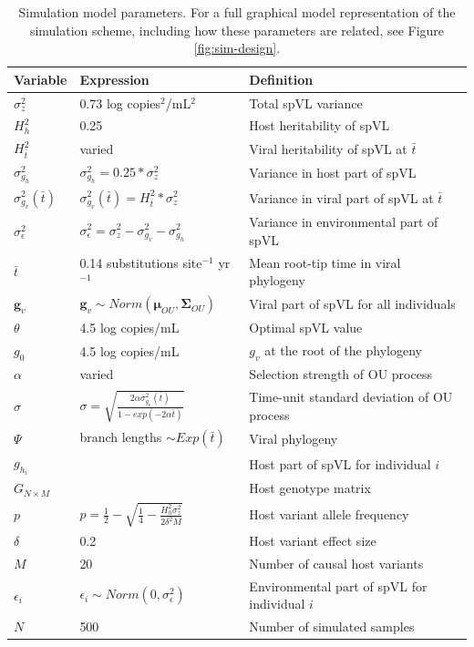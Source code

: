 \documentclass[11pt]{article}
\begin{document}
\begin{linenumbers}
\begin{table}[H]
	\caption{Simulation model parameters. For a full graphical model representation of the simulation scheme, including how these parameters are related, see Figure \ref{fig:sim-design}.}
	\begin{tabularx}{\linewidth}{p{1.5cm}ll} \toprule 
		Variable & Expression & Definition \\ \midrule 
		$\sigma^2_z$ &  0.73 log copies$^{2}$/mL$^{2}$ & Total spVL variance \\ 
		$H^2_h$ & 0.25 & Host heritability of spVL \\
		$H^2_{\bar{t}}$ & varied & Viral heritability of spVL at $\bar{t}$ \\
		$\sigma^2_{g_h}$ & $\sigma_{g_h}^2 = 0.25*\sigma_z^2$ & Variance in host part of spVL \\
		$\sigma^2_{g_v}(\bar{t})$ & $\sigma^2_{g_{v}}(\bar{t}) = H^2_{\bar{t}}*\sigma_z^2$ & Variance in viral part of spVL at $\bar{t}$ \\ 
		$\sigma^2_{\epsilon}$ & $\sigma_{\epsilon}^2 = \sigma_z^2 - \sigma^2_{g_v} - \sigma^2_{g_h}$ & Variance in environmental part of spVL \\ 
		$\bar{t}$ & 0.14 substitutions site$^{-1}$ yr$^{-1}$ & Mean root-tip time in viral phylogeny \\ 
		$\bm{g}_v$ & $\bm{g}_v \sim Norm(\bm{\mu}_{OU}, \boldsymbol{\Sigma}_{OU})$ & Viral part of spVL for all individuals \\ 
		$\theta$ & 4.5 log copies/mL & Optimal spVL value \\
		$g_{0}$ & 4.5 log copies/mL & $g_v$ at the root of the phylogeny  \\ 
		$\alpha$ & varied & Selection strength of OU process \\ 
		$\sigma$ & $\sigma = \sqrt{\frac{2\alpha\sigma^2_{g_{v}}(\bar{t})}{1 - exp(-2\alpha\bar{t})}}$ & Time-unit standard deviation of OU process \\ 
		$\Psi$ & branch lengths $\sim Exp(\bar{t})$ & Viral phylogeny \\ 
		$g_{h_i}$ & \makecell{$g_{h_i} = \delta \sum_{j = 1}^{j = M/2}{G_{ij}} - \\ \delta \sum_{j = M/2}^{j = M}{G_{ij}}$} & Host part of spVL for individual $i$ \\ 
		$G_{N \times M}$ & \makecell{$G_{ij} \sim Binom(2, p)\ \\ \forall i \in {1...N}, \forall j \in {1...M}$} & Host genotype matrix \\
		$p$ & $p = \frac{1}{2} - \sqrt{\frac{1}{4} - \frac{H_{h}^2\sigma^2_z}{2\delta^2M}}$ &  Host variant allele frequency \\ 
		$\delta$ & 0.2 & Host variant effect size \\ 
		$M$ & 20 & Number of causal host variants \\ 
		$\epsilon_i$ & $ \epsilon_i \sim Norm(0, \sigma^2_{\epsilon})$ & Environmental part of spVL for individual $i$ \\ 
		$N$ & 500 & Number of simulated samples \\ \bottomrule 
	\end{tabularx}
	\label{tab:sim-params}
\end{table}


\end{linenumbers}
\end{document}
